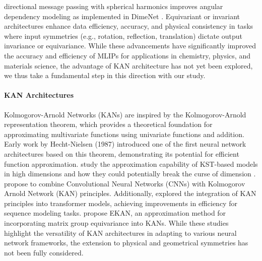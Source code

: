 directional message passing with spherical harmonics improves angular dependency modeling as implemented in DimeNet \cite{Gasteiger_Groß_Günnemann_2022}.  
Equivariant or invariant architectures enhance data efficiency, accuracy, and physical consistency in tasks where input symmetries (e.g., rotation, reflection, translation) dictate output invariance or equivariance.
While these advancements have significantly improved the accuracy and efficiency of MLIPs for applications in chemistry, physics, and materials science, the advantage of KAN architecture has not yet been explored, we thus take a fundamental step in this direction with our study. 

\paragraph{KAN Architectures}
Kolmogorov-Arnold Networks (KANs) are inspired by the Kolmogorov-Arnold representation theorem, which provides a theoretical foundation for approximating multivariate functions using univariate functions and addition. Early work by Hecht-Nielsen (1987) \cite{hecht1987kolmogorov} introduced one of the first neural network architectures based on this theorem, demonstrating its potential for efficient function approximation. 
\cite{lai2021kolmogorov} study the approximation capability of KST-based models in high dimensions and how they could potentially break the curse of dimension \cite{poggio2022deep}. 
\cite{ferdausKANICEKolmogorovArnoldNetworks2024} propose to combine  Convolutional Neural Networks (CNNs) with Kolmogorov Arnold Network (KAN) principles.
Additionally, 
\cite{yangKolmogorovArnoldTransformer2024}
explored the integration of KAN principles into transformer models, achieving improvements in efficiency for sequence modeling tasks. 
\cite{huEKANEquivariantKolmogorovArnold2024a} propose EKAN, an approximation method for incorporating matrix group equivariance into KANs. While these studies highlight the versatility of KAN architectures in adapting to various neural network frameworks, the extension to physical and geometrical symmetries has not been fully considered.

